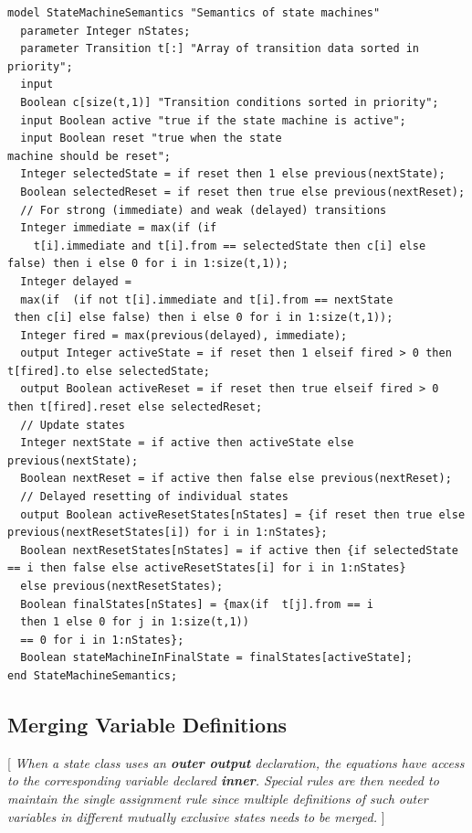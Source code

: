 \documentclass[10pt,a4paper]{report}
\def\doublelabel#1{\label{#1}\hypertarget{#1}{}}
\begin{document}
\begin{lstlisting}[language=modelica]
model StateMachineSemantics "Semantics of state machines"
  parameter Integer nStates;
  parameter Transition t[:] "Array of transition data sorted in priority";
  input
  Boolean c[size(t,1)] "Transition conditions sorted in priority";
  input Boolean active "true if the state machine is active";
  input Boolean reset "true when the state
machine should be reset";
  Integer selectedState = if reset then 1 else previous(nextState);
  Boolean selectedReset = if reset then true else previous(nextReset);
  // For strong (immediate) and weak (delayed) transitions
  Integer immediate = max(if (if 
    t[i].immediate and t[i].from == selectedState then c[i] else false) then i else 0 for i in 1:size(t,1));
  Integer delayed =   
  max(if  (if not t[i].immediate and t[i].from == nextState
 then c[i] else false) then i else 0 for i in 1:size(t,1));
  Integer fired = max(previous(delayed), immediate);
  output Integer activeState = if reset then 1 elseif fired > 0 then t[fired].to else selectedState;
  output Boolean activeReset = if reset then true elseif fired > 0 then t[fired].reset else selectedReset;
  // Update states
  Integer nextState = if active then activeState else previous(nextState);
  Boolean nextReset = if active then false else previous(nextReset);
  // Delayed resetting of individual states
  output Boolean activeResetStates[nStates] = {if reset then true else previous(nextResetStates[i]) for i in 1:nStates};
  Boolean nextResetStates[nStates] = if active then {if selectedState == i then false else activeResetStates[i] for i in 1:nStates} 
  else previous(nextResetStates);
  Boolean finalStates[nStates] = {max(if  t[j].from == i
  then 1 else 0 for j in 1:size(t,1))
  == 0 for i in 1:nStates};
  Boolean stateMachineInFinalState = finalStates[activeState];
end StateMachineSemantics;
\end{lstlisting}
\subsection{Merging Variable Definitions}\doublelabel{merging-variable-definitions}

{[} \emph{When a state class uses an \textbf{outer output} declaration,
the equations have access to the corresponding variable declared
\textbf{inner}. Special rules are then needed to maintain the single
assignment rule since multiple definitions of such outer variables in
different mutually exclusive states needs to be merged.} {]}
\end{document}
